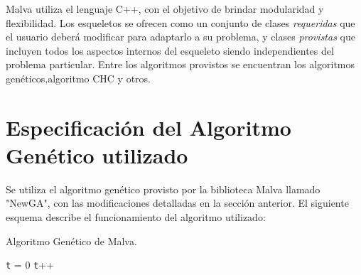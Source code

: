 Malva utiliza el lenguaje C++, con el objetivo de brindar modularidad y flexibilidad. Los esqueletos se ofrecen como un conjunto de clases \emph{requeridas} que el usuario deberá modificar para adaptarlo a su problema, y clases \emph{provistas} que incluyen todos los aspectos internos del esqueleto siendo  independientes del problema particular. Entre los algoritmos provistos se encuentran los algoritmos genéticos,algoritmo  CHC \citep{CHC} y otros.


\section{Especificación del Algoritmo Genético utilizado}
Se utiliza el algoritmo genético provisto por la biblioteca  Malva llamado "NewGA", con las modificaciones detalladas en la sección anterior. El siguiente esquema describe el funcionamiento del algoritmo utilizado:

\begin{algorithm}[H]
	\caption{Algoritmo Genético de Malva. }
	\label{alg:algoritmo_genetico_malva}
	\begin{algorithmic} [1] 
		{
			\STATE \texttt{t} = 0
			\STATE \texttt{t}++		
			\ENDWHILE
		}
	\end{algorithmic}
	
\end{algorithm}

